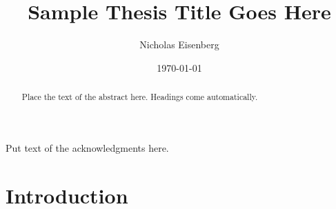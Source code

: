 \documentclass[12pt]{report}
\title{Sample Thesis Title Goes Here}
\author{Nicholas Eisenberg}
\date{\today} %
\theoremstyle{plain}
\theoremstyle{definition}
\numberwithin{equation}{section}
\begin{document}
\begin{romanpages}      %

\TitlePage 

\begin{abstract} 
Place the text of the abstract here. Headings come automatically.
\end{abstract}

\begin{acknowledgments}
Put text of the acknowledgments here.
\end{acknowledgments}

\begin{singlespace}

\begin{center} 
\renewcommand{\cftchapfont}{}
\renewcommand{\cftchappagefont}{}
\renewcommand{\cfttoctitlefont}{\normalsize}%
\renewcommand{\cftsecfont }{\normalsize}%
\renewcommand{\cftsecpagefont}{\normalsize}%
\tableofcontents 
\newpage
\renewcommand{\cftchapfont}{}
\renewcommand{\cftchappagefont}{}
\renewcommand{\cftloftitlefont}{\normalsize}%
\renewcommand{\cftsecfont}{\normalsize}%
\renewcommand{\cftsecpagefont}{\normalsize}%
\listoffigures
\newpage
\renewcommand{\cftchapfont}{}
\renewcommand{\cftchappagefont}{}
\renewcommand{\cftlottitlefont}{\normalsize}%
\renewcommand{\cftsecfont}{\normalsize}%
\renewcommand{\cftsecpagefont}{\normalsize}%
\listoftables
\end{center}
\end{singlespace}

\printnomenclature[0.5in] %
\end{romanpages}        %


\normalem       %

 \chapter {Introduction}  %
\vspace{-1cm} %
 
\end{document}
